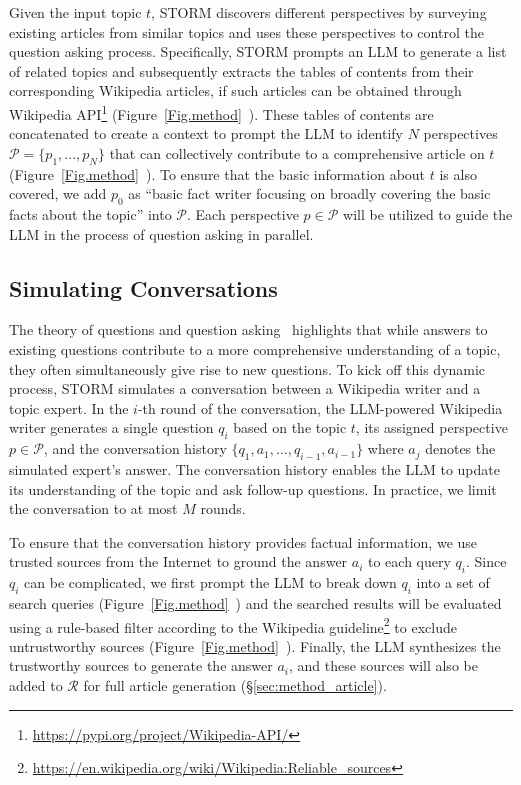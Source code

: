 \documentclass[11pt]{article}
\newcommand{\system}[0]{STORM\xspace}
\newcommand{\reffig}[1]{Figure~\ref{#1}}
\newcommand{\refsec}[1]{\S\ref{#1}} %
\begin{document}
Given the input topic $t$, \system discovers different perspectives by surveying existing articles from similar topics and uses these perspectives to control the question asking process. Specifically, \system prompts an LLM to generate a list of related topics and subsequently extracts the tables of contents from their corresponding Wikipedia articles, if such articles can be obtained through Wikipedia API\footnote{\url{https://pypi.org/project/Wikipedia-API/}} (\reffig{Fig.method}~). These tables of contents are concatenated to create a context to prompt the LLM to identify $N$ perspectives $\mathcal{P}=\{p_1,...,p_N\}$ that can collectively contribute to a comprehensive article on $t$ (\reffig{Fig.method}~). To ensure that the basic information about $t$ is also covered, we add $p_0$ as ``basic fact writer focusing on broadly covering the basic facts about the topic'' into $\mathcal{P}$. Each perspective $p \in\mathcal{P}$ will be utilized to guide the LLM in the process of question asking in parallel. 

\subsection{Simulating Conversations}
\label{sec:method_conv}
The theory of questions and question asking~\citep{ram1991theory} highlights that while answers to existing questions contribute to a more comprehensive understanding of a topic, they often simultaneously give rise to new questions. To kick off this dynamic process, \system simulates a conversation between a Wikipedia writer and a topic expert. In the $i$-th round of the conversation, the LLM-powered Wikipedia writer generates a single question $q_i$ based on the topic $t$, its assigned perspective $p\in\mathcal{P}$, and the conversation history $\{q_1, a_1,...,q_{i-1}, a_{i-1}\}$ where $a_j$ denotes the simulated expert's answer. The conversation history enables the LLM to update its understanding of the topic and ask follow-up questions. In practice, we limit the conversation to at most $M$ rounds.

To ensure that the conversation history provides factual information, we use trusted sources from the Internet to ground the answer $a_i$ to each query $q_i$. 
Since $q_i$ can be complicated, we first prompt the LLM to break down $q_i$ into a set of search queries (\reffig{Fig.method}~) and the searched results will be evaluated using a rule-based filter according to the Wikipedia guideline\footnote{\url{https://en.wikipedia.org/wiki/Wikipedia:Reliable_sources}} to exclude untrustworthy sources (\reffig{Fig.method}~). Finally, the LLM synthesizes the trustworthy sources to generate the answer $a_i$, and these sources will also be added to $\mathcal{R}$ for full article generation (\refsec{sec:method_article}).
\end{document}
